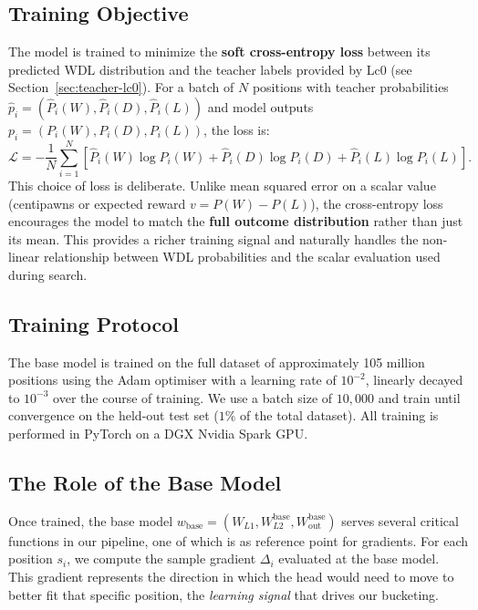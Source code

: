 \subsection{Training Objective}\label{sec:method-loss}

The model is trained to minimize the \textbf{soft cross-entropy loss} between its predicted WDL distribution and the teacher labels provided by Lc0 (see Section~\ref{sec:teacher-lc0}). For a batch of \(N\) positions with teacher probabilities \(\hat{p}_i = (\hat{P}_i(W), \hat{P}_i(D), \hat{P}_i(L))\) and model outputs \(p_i = (P_i(W), P_i(D), P_i(L))\), the loss is:
\[
\mathcal{L} = -\frac{1}{N} \sum_{i=1}^N \left[ \hat{P}_i(W) \log P_i(W) + \hat{P}_i(D) \log P_i(D) + \hat{P}_i(L) \log P_i(L) \right].
\]
This choice of loss is deliberate. Unlike mean squared error on a scalar value (centipawns or expected reward \(v = P(W) - P(L)\)), the cross-entropy loss encourages the model to match the \textbf{full outcome distribution} rather than just its mean. This provides a richer training signal and naturally handles the non-linear relationship between WDL probabilities and the scalar evaluation used during search.

\subsection{Training Protocol}\label{sec:method-protocol}

The base model is trained on the full dataset of approximately 105 million positions using the Adam optimiser with a learning rate of \(10^{-2}\), linearly decayed to \(10^{-3}\) over the course of training. We use a batch size of \(10{,}000\) and train until convergence on the held-out test set (\(1\%\) of the total dataset). All training is performed in PyTorch on a DGX Nvidia Spark GPU.

\subsection{The Role of the Base Model}\label{sec:base-role}

Once trained, the base model \(w_{\mathrm{base}} = (W_{L1}, W_{L2}^{\mathrm{base}}, W_{\mathrm{out}}^{\mathrm{base}})\) serves several critical functions in our pipeline, one of which is as reference point for gradients. For each position \(s_i\), we compute the sample gradient \(\Delta_i\) evaluated at the base model. This gradient represents the direction in which the head would need to move to better fit that specific position, the \emph{learning signal} that drives our bucketing.

